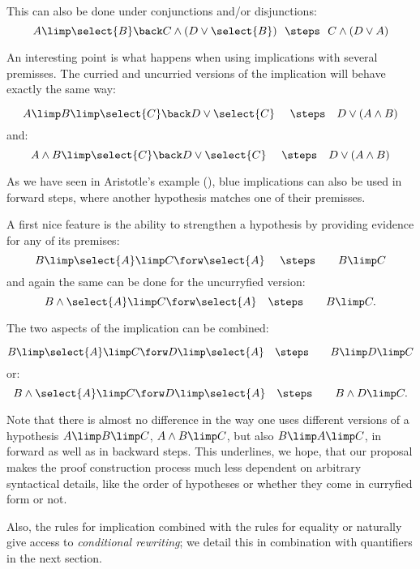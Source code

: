 This can also be done under conjunctions and/or disjunctions:
$$
  A\limp \select{B} \back C \land (D\lor \select{B}) ~~ \steps ~~ C \land (D\lor A)
$$

An interesting point is what happens when using implications with
several premisses. The curried and uncurried versions of the
implication will behave exactly the same way:

$$
  A\limp B \limp \select{C} \back D\lor \select{C}
  ~~~\/ ~\steps~~~  D\lor (A\land B)
$$
and:
$$
  A\land B \limp \select{C} \back D\lor \select{C}
  ~~~ \/ ~\steps~~~  D\lor (A\land B)
$$


As we have seen in Aristotle's example (), blue
implications can also be used in forward steps, where another
hypothesis matches one of their premisses.

A first nice feature is the ability to strengthen a hypothesis by
providing evidence for any of its premises:
$$
B\limp \select{A}\limp C \forw \select {A}  ~~\/~\/~\steps~\/~~~~~
B\limp C$$
and again the same can be done for the uncurryfied version:
$$
B\land \select{A}\limp C \forw \select {A}  ~\/~\/~\steps~\/~~~~~
B\limp C.$$

The two aspects of the implication can be combined:

$$
B\limp \select{A}\limp C \forw D\limp\select {A}  ~\/~\/~\steps~\/~~~~~
B\limp D\limp C$$
or:
$$
B\land \select{A}\limp C \forw D\limp\select {A}  ~\/~\/~\steps~\/~~~~~
B\land D \limp C.$$


Note that there is almost no difference in the way one uses different
versions of a hypothesis $A\limp B\limp C$, $A\land B\limp
C$, but also $B\limp A\limp C$, in forward as well as in
backward steps. This underlines, we hope, that our
proposal makes the proof construction process much less dependent on
arbitrary syntactical details, like the order of hypotheses or whether
they come in curryfied form or not.

Also, the rules for implication combined with the rules for equality
 or  naturally give access to {\em
  conditional rewriting}; we detail this in combination with
quantifiers in the next section.

